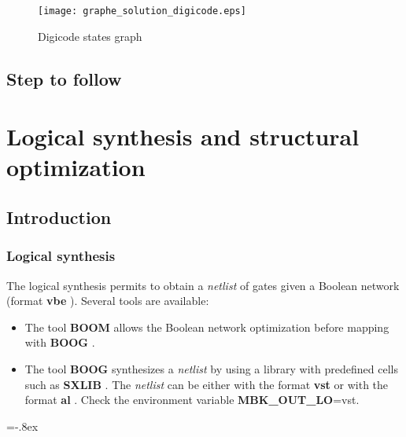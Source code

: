 \documentclass[12pt]{article}
\newenvironment{commandline}
  {\VerbatimEnvironment\par\vspace*{2mm}\noindent\footnotesize
   \begin{Sbox}\begin{minipage}{.979\textwidth}\begin{Verbatim}}%
  {\end{Verbatim}\end{minipage}\end{Sbox}\setlength{\shadowsize}{2pt}%
  \shadowbox{\TheSbox}\normalsize\par\noindent}
\begin{document}
{\begin{figure}[H]\centering
 \texttt{[image: graphe\_solution\_digicode.eps]}
 \caption{Digicode states graph}
 \label{Fig:graph 2}
\end{figure}

\subsection{Step to follow}


\newpage

\section{Logical synthesis and structural optimization}

\subsection{Introduction}

\subsubsection{Logical synthesis}
    The logical synthesis permits to obtain a { \it netlist } of
    gates given a Boolean network (format { \bf vbe }). 
    Several tools are available:

\begin{itemize}\itemsep=-.8ex
\item  The tool { \bf BOOM } allows the Boolean network optimization before mapping with { \bf BOOG }.
\item  The tool { \bf BOOG } synthesizes a { \it netlist } by using a library
       with predefined cells such as { \bf SXLIB }.
       The { \it netlist } can be either with the format { \bf vst } or with the format { \bf al }.
       Check the environment variable { \bf MBK\_OUT\_LO}=vst.
\end{itemize}\itemsep=-.8ex

}
\end{document}
